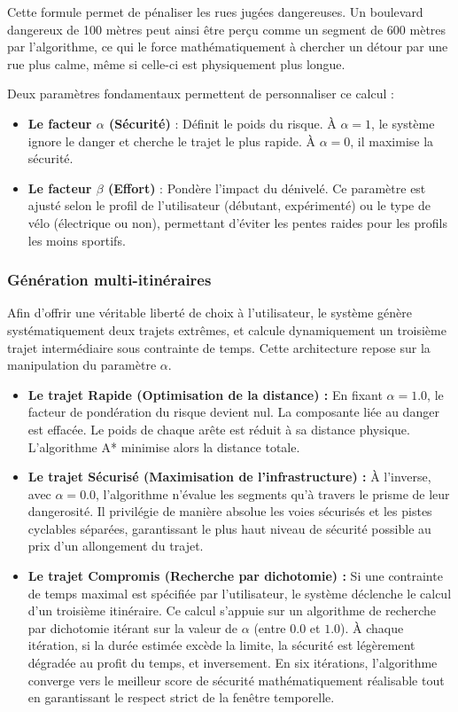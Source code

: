 Cette formule permet de pénaliser les rues jugées dangereuses. Un boulevard dangereux de 100 mètres peut ainsi être perçu comme un segment de 600 mètres par l'algorithme, ce qui le force mathématiquement à chercher un détour par une rue plus calme, même si celle-ci est physiquement plus longue.

Deux paramètres fondamentaux permettent de personnaliser ce calcul :
\begin{itemize}
\item \textbf{Le facteur $\alpha$ (Sécurité)} : Définit le poids du risque. À $\alpha=1$, le système ignore le danger et cherche le trajet le plus rapide. À $\alpha=0$, il maximise la sécurité.
\item \textbf{Le facteur $\beta$ (Effort)} : Pondère l'impact du dénivelé. Ce paramètre est ajusté selon le profil de l'utilisateur (débutant, expérimenté) ou le type de vélo (électrique ou non), permettant d'éviter les pentes raides pour les profils les moins sportifs.
\end{itemize}

\subsubsection{Génération multi-itinéraires}

Afin d'offrir une véritable liberté de choix à l'utilisateur, le système génère systématiquement deux trajets extrêmes, et calcule dynamiquement un troisième trajet intermédiaire sous contrainte de temps. 
Cette architecture repose sur la manipulation du paramètre $\alpha$.

\begin{itemize}
    \item \textbf{Le trajet Rapide (Optimisation de la distance) :} En fixant $\alpha = 1.0$, le facteur de pondération du risque devient nul.
    La composante liée au danger est effacée. Le poids de chaque arête est réduit à sa distance physique. L'algorithme A* minimise alors la distance totale.
    
    \item \textbf{Le trajet Sécurisé (Maximisation de l'infrastructure) :} À l'inverse, avec $\alpha = 0.0$, l'algorithme n'évalue les segments qu'à travers le prisme de leur dangerosité. 
    Il privilégie de manière absolue les voies sécurisés et les pistes cyclables séparées, garantissant le plus haut niveau de sécurité possible au prix d'un allongement du trajet.
    
    \item \textbf{Le trajet Compromis (Recherche par dichotomie) :} Si une contrainte de temps maximal est spécifiée par l'utilisateur, le système déclenche le calcul d'un troisième itinéraire. 
    Ce calcul s'appuie sur un algorithme de recherche par dichotomie itérant sur la valeur de $\alpha$ (entre $0.0$ et $1.0$). 
    À chaque itération, si la durée estimée excède la limite, la sécurité est légèrement dégradée au profit du temps, et inversement. 
    En six itérations, l'algorithme converge vers le meilleur score de sécurité mathématiquement réalisable tout en garantissant le respect strict de la fenêtre temporelle.
\end{itemize}